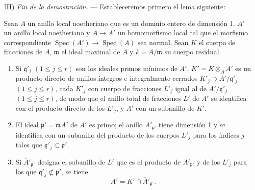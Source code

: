 III) \emph{Fin de la demostración.} --- Estableceremos primero el lema
siguiente:

\begin{lemma}[6.14.1.2]
\label{IV.2.s6.14.1.2-fr}
Sean $A$ un anillo local noetheriano que es un dominio entero de
dimensión 1, $A'$ un anillo local noetheriano y $A\to A'$ un
homomorfismo local tal que el morfismo correspondiente
$\operatorname{Spec}(A')\to\operatorname{Spec}(A)$ sea normal. Sean $K$
el cuerpo de fracciones de $A$, $\mathfrak m$ el ideal maximal de $A$
y $k=A/\mathfrak m$ su cuerpo residual.
\begin{enumerate}
\item[\textup{(i)}] Si $\mathfrak q'_j$ $(1\leqslant j\leqslant r)$ son los
ideales primos mínimos de $A'$, $K'=K\otimes_A A'$ es un producto directo
de anillos íntegros e integralmente cerrados $K'_j\supset A'/\mathfrak q'_j$ $(1\leqslant j\leqslant r)$, cada $K'_j$ con cuerpo de fracciones $L'_j$ igual al de
$A'/\mathfrak q'_j$ $(1\leqslant j\leqslant r)$, de modo que el anillo total de fracciones $L'$ de $A'$ se identifica con
el producto directo de los $L'_j$, y $A'$ con un subanillo de $K'$.
\item[\textup{(ii)}] El ideal $\mathfrak p'=\mathfrak mA'$ de $A'$ es primo; el
anillo $A'_{\mathfrak p'}$ tiene dimensión 1 y se identifica con un
subanillo del producto de los cuerpos $L'_j$ para los índices $j$
tales que $\mathfrak q'_j\subset\mathfrak p'$.
\item[\textup{(iii)}] Si $\overline{A}'_{\mathfrak p'}$ designa el subanillo de
$L'$ que es el producto de $A'_{\mathfrak p'}$ y de los $L'_j$ para
los que $\mathfrak q'_j\not\subset\mathfrak p'$, se tiene
\begin{equation}
\tag{6.14.1.3}
\label{IV.2.s6.14.1.3-fr}
A'=K'\cap\overline{A}'_{\mathfrak p'}.
\end{equation}
\end{enumerate}
\end{lemma}
